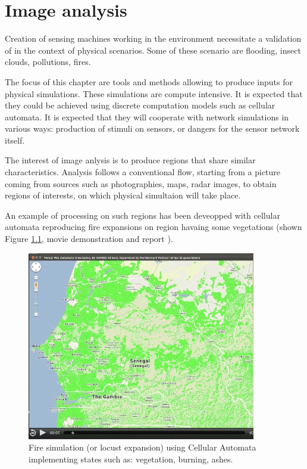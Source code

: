 
\chapter{Image analysis} 
 
Creation of sensing machines working in the environment necessitate 
a validation of in the context of physical scenarios. Some of these 
scenario are flooding, insect clouds, pollutions, fires.

The focus of this chapter are tools and methods allowing to produce inputs
for physical  simulations. These simulations are compute intensive. It is expected
that they could be achieved using discrete computation models such as
cellular automata. It is expected that they will cooperate with network simulations
in various ways: production of stimuli on sensors, or dangers for the sensor network
itself.

The interest of image anlysis is to produce regions that share similar characteristics.
Analysis follows a conventional flow, starting from a picture coming from sources such as
photographies, maps, radar images, to obtain regions of interests, on which physical simultaion will
take place.

An example of processing on such regions has been deveopped with cellular automata
reproducing fire expansions on region havaing some vegetations (shown Figure \ref{fig:AhmedFire},
movie demonstration and report \cite{AhmedFire}).


\begin{figure}[hbtp]
\begin{center} 
\includegraphics[width=10cm]{AhmedFire.png}
\caption{Fire simulation (or locust expansion) using Cellular Automata implementing  states such as:
vegetation, burning, ashes.}
\label{fig:AhmedFire}
\end{center}
\end{figure}

